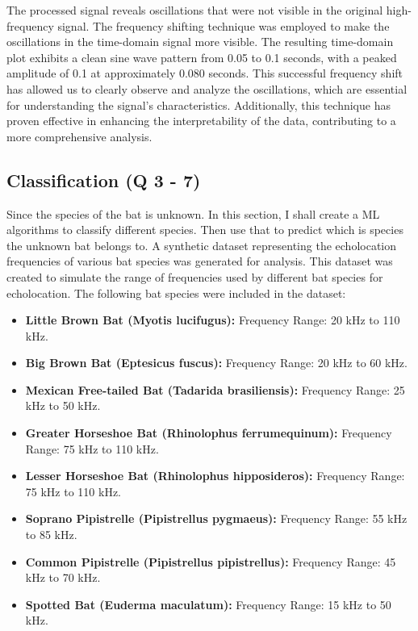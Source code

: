 \documentclass[12pt]{article}
\begin{document}
The processed signal reveals oscillations that were not visible in the original high-frequency signal. The frequency shifting technique was employed to make the oscillations in the time-domain signal more visible. The resulting time-domain plot exhibits a clean sine wave pattern from 0.05 to 0.1 seconds, with a peaked amplitude of 0.1 at approximately 0.080 seconds. This successful frequency shift has allowed us to clearly observe and analyze the oscillations, which are essential for understanding the signal's characteristics. Additionally, this technique has proven effective in enhancing the interpretability of the data, contributing to a more comprehensive analysis.

\subsection{Classification (Q 3 - 7)}
Since the species of the bat is unknown. In this section, I shall create a ML algorithms to classify different species. Then use that to predict which is species the unknown bat belongs to. A synthetic dataset representing the echolocation frequencies of various bat species was generated for analysis. This dataset was created to simulate the range of frequencies used by different bat species for echolocation. The following bat species were included in the dataset:

\begin{itemize}
    \item \textbf{Little Brown Bat (Myotis lucifugus):} Frequency Range: 20 kHz to 110 kHz.

    \item \textbf{Big Brown Bat (Eptesicus fuscus):} Frequency Range: 20 kHz to 60 kHz.

    \item \textbf{Mexican Free-tailed Bat (Tadarida brasiliensis):} Frequency Range: 25 kHz to 50 kHz.

    \item \textbf{Greater Horseshoe Bat (Rhinolophus ferrumequinum):} Frequency Range: 75 kHz to 110 kHz.

    \item \textbf{Lesser Horseshoe Bat (Rhinolophus hipposideros):} Frequency Range: 75 kHz to 110 kHz.

    \item \textbf{Soprano Pipistrelle (Pipistrellus pygmaeus):} Frequency Range: 55 kHz to 85 kHz.

    \item \textbf{Common Pipistrelle (Pipistrellus pipistrellus):} Frequency Range: 45 kHz to 70 kHz.

    \item \textbf{Spotted Bat (Euderma maculatum):} Frequency Range: 15 kHz to 50 kHz.
\end{itemize}
\end{document}
